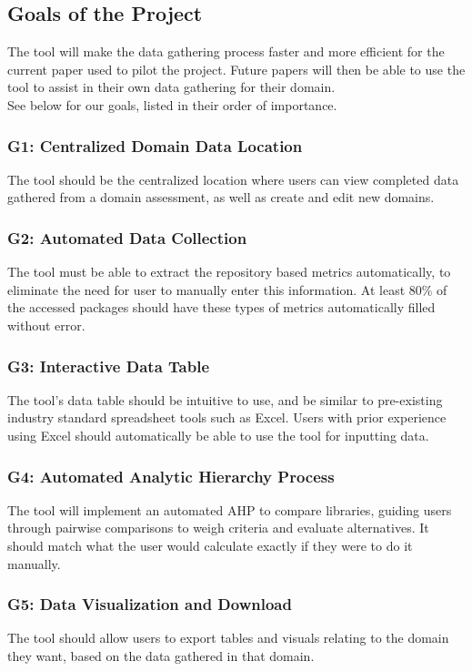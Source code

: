 \documentclass[12pt]{article}
\begin{document}
\subsection{Goals of the Project}
The tool will make the data gathering process faster and more efficient for the current paper used to pilot the project. Future papers will then be able to use the tool to assist in their own data gathering for their domain.\\
See below for our goals, listed in their order of importance.
\subsubsection{G1: Centralized Domain Data Location}\label{goal-central-data}
The tool should be the centralized location where users can view completed data gathered from a domain assessment, as well as create and edit new domains.
\subsubsection{G2: Automated Data Collection}\label{goal-auto-data}
The tool must be able to extract the repository based metrics automatically, to eliminate the need for user to manually enter this information. At least 80\% of the accessed packages should have these types of metrics automatically filled without error.
\subsubsection{G3: Interactive Data Table}\label{goal-data-table}
The tool's data table should be intuitive to use, and be similar to pre-existing industry standard spreadsheet tools such as Excel. Users with prior experience using Excel should automatically be able to use the tool for inputting data.
\subsubsection{G4: Automated Analytic Hierarchy Process}\label{goal-auto-ahp}
The tool will implement an automated AHP to compare libraries, guiding users through pairwise comparisons to weigh criteria and evaluate alternatives. It should match what the user would calculate exactly if they were to do it manually.
\subsubsection{G5: Data Visualization and Download} \label{goal-visual}
The tool should allow users to export tables and visuals relating to the domain they want, based on the data gathered in that domain.
\end{document}
